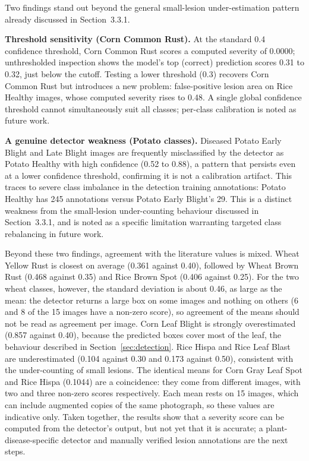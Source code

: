 Two findings stand out beyond the general small-lesion
under-estimation pattern already discussed in Section~3.3.1.

\textbf{Threshold sensitivity (Corn Common Rust).} At the standard
0.4 confidence threshold, Corn Common Rust scores a computed severity
of 0.0000; unthresholded inspection shows the model's top (correct)
prediction scores 0.31 to 0.32, just below the cutoff. Testing a lower
threshold (0.3) recovers Corn Common Rust but introduces a new
problem: false-positive lesion area on Rice Healthy images, whose
computed severity rises to 0.48. A single global confidence threshold
cannot simultaneously suit all classes; per-class calibration is
noted as future work.

\textbf{A genuine detector weakness (Potato classes).} Diseased
Potato Early Blight and Late Blight images are frequently
misclassified by the detector as Potato Healthy with high confidence
(0.52 to 0.88), a pattern that persists even at a lower confidence
threshold, confirming it is not a calibration artifact. This traces
to severe class imbalance in the detection training annotations:
Potato Healthy has 245 annotations versus Potato Early Blight's 29.
This is a distinct weakness from the small-lesion under-counting
behaviour discussed in Section~3.3.1, and is noted as a specific
limitation warranting targeted class rebalancing in future work.

Beyond these two findings, agreement with the literature values is mixed.
Wheat Yellow Rust is closest on average (0.361 against 0.40), followed by
Wheat Brown Rust (0.468 against 0.35) and Rice Brown Spot (0.406 against
0.25). For the two wheat classes, however, the standard deviation is about
0.46, as large as the mean: the detector returns a large box on some images
and nothing on others (6 and 8 of the 15 images have a non-zero score), so
agreement of the means should not be read as agreement per image. Corn Leaf
Blight is strongly overestimated (0.857 against 0.40), because the predicted
boxes cover most of the leaf, the behaviour described in
Section~\ref{sec:detection}. Rice Hispa and Rice Leaf Blast are
underestimated (0.104 against 0.30 and 0.173 against 0.50), consistent with
the under-counting of small lesions. The identical means for Corn Gray Leaf
Spot and Rice Hispa (0.1044) are a coincidence: they come from different
images, with two and three non-zero scores respectively. Each mean rests on
15 images, which can include augmented copies of the same photograph, so
these values are indicative only. Taken together, the results show that a
severity score can be computed from the detector's output, but not yet that
it is accurate; a plant-disease-specific detector and manually verified
lesion annotations are the next steps.


